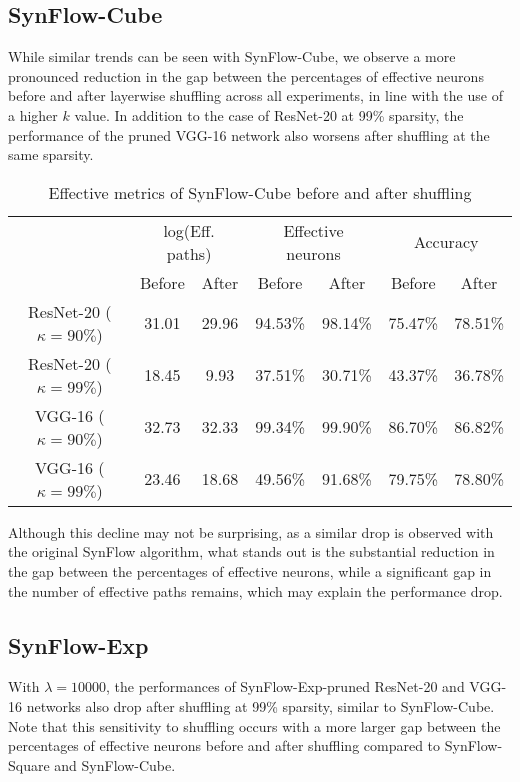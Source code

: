 \subsection{SynFlow-Cube}
While similar trends can be seen with SynFlow-Cube, we observe a more pronounced reduction in the gap between the percentages of effective neurons before and after layerwise shuffling across all experiments, in line with the use of a higher $k$ value. In addition to the case of ResNet-20 at 99\% sparsity, the performance of the pruned VGG-16 network also worsens after shuffling at the same sparsity.
\begin{table}[h!]
\centering
\begin{tabular}{|c|cc|cc|cc|}
\hline
\multirow{2}{*}{} & \multicolumn{2}{c|}{log(Eff. paths)} & \multicolumn{2}{c|}{Effective neurons} & \multicolumn{2}{c|}{Accuracy} \\ \cline{2-7} 
                  & Before            & After            & Before             & After             & Before        & After         \\ \hline
ResNet-20 ($\kappa=90\%$)        & 31.01             & 29.96            & 94.53\%     & 98.14\%    & 75.47\%       & 78.51\%       \\ \hline
ResNet-20 ($\kappa=99\%$)        & 18.45             & 9.93            & 37.51\%     & 30.71\%    & 43.37\%       & 36.78\%       \\ \hline
VGG-16 ($\kappa=90\%$)           & 32.73             & 32.33            & 99.34\%     & 99.90\%    & 86.70\%       & 86.82\%       \\ \hline
VGG-16 ($\kappa=99\%$)           & 23.46             & 18.68            & 49.56\%     & 91.68\%    & 79.75\%       & 78.80\%       \\ \hline
\end{tabular}
\caption{Effective metrics of SynFlow-Cube before and after shuffling}
\label{table:sf-cube}
\end{table}

Although this decline may not be surprising, as a similar drop is observed with the original SynFlow algorithm, what stands out is the substantial reduction in the gap between the percentages of effective neurons, while a significant gap in the number of effective paths remains, which may explain the performance drop.

\subsection{SynFlow-Exp}
With $\lambda=10000$, the performances of SynFlow-Exp-pruned ResNet-20 and VGG-16 networks also drop after shuffling at 99\% sparsity, similar to SynFlow-Cube. Note that this sensitivity to shuffling occurs with a more larger gap between the percentages of effective neurons before and after shuffling compared to SynFlow-Square and SynFlow-Cube.

